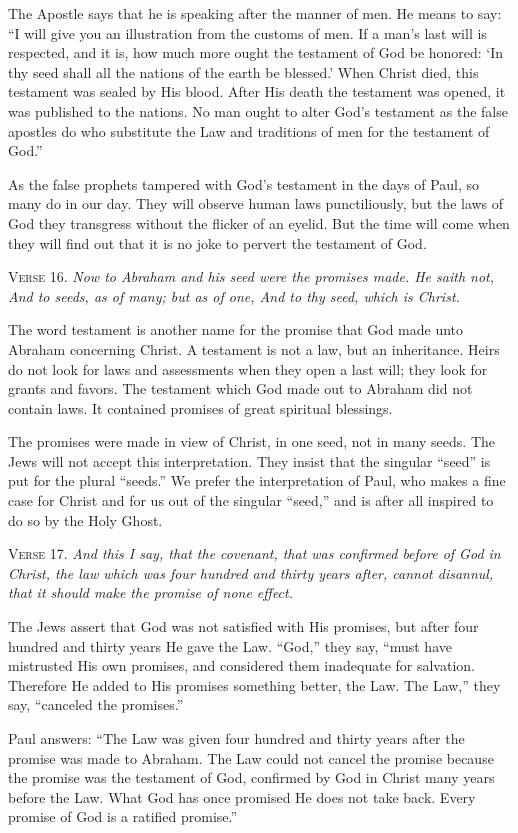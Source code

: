 The Apostle says that he is speaking after the manner of men. He means to say: “I will give you an illustration from the customs of men. If a man’s last will is respected, and it is, how much more ought the testament of God be honored: ‘In thy seed shall all the nations of the earth be blessed.’ When Christ died, this testament was sealed by His blood. After His death the testament was opened, it was published to the nations. No man ought to alter God’s testament as the false apostles do who substitute the Law and traditions of men for the testament of God.”

As the false prophets tampered with God’s testament in the days of Paul, so many do in our day. They will observe human laws punctiliously, but the laws of God they transgress without the flicker of an eyelid. But the time will come when they will find out that it is no joke to pervert the testament of God.

\textsc{Verse} 16. \emph{Now to Abraham and his seed were the promises made. He saith not, And to seeds, as of many; but as of one, And to thy seed, which is Christ.}

The word testament is another name for the promise that God made unto Abraham concerning Christ. A testament is not a law, but an inheritance. Heirs do not look for laws and assessments when they open a last will; they look for grants and favors. The testament which God made out to Abraham did not contain laws. It contained promises of great spiritual blessings.

The promises were made in view of Christ, in one seed, not in many seeds. The Jews will not accept this interpretation. They insist that the singular “seed” is put for the plural “seeds.” We prefer the interpretation of Paul, who makes a fine case for Christ and for us out of the singular “seed,” and is after all inspired to do so by the Holy Ghost.

\textsc{Verse} 17. \emph{And this I say, that the covenant, that was confirmed before of God in Christ, the law which was four hundred and thirty years after, cannot disannul, that it should make the promise of none effect.}

The Jews assert that God was not satisfied with His promises, but after four hundred and thirty years He gave the Law. “God,” they say, “must have mistrusted His own promises, and considered them inadequate for salvation. Therefore He added to His promises something better, the Law. The Law,” they say, “canceled the promises.”

Paul answers: “The Law was given four hundred and thirty years after the promise was made to Abraham. The Law could not cancel the promise because the promise was the testament of God, confirmed by God in Christ many years before the Law. What God has once promised He does not take back. Every promise of God is a ratified promise.”

